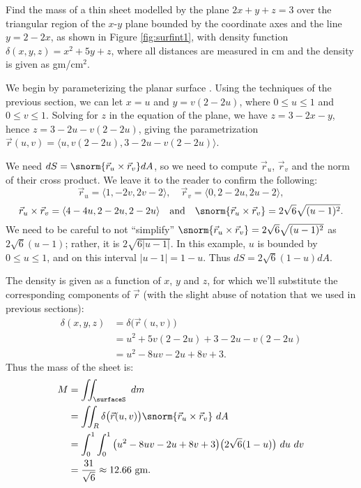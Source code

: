 {Find the mass of a thin sheet modelled by the plane $2x+y+z=3$ over the triangular region of the $x$-$y$ plane bounded by the coordinate axes and the line $y=2-2x$, as shown in Figure \ref{fig:surfint1}, with density function $\delta(x,y,z) = x^2+5y+z$, where all distances are measured in cm and the density is given as gm/cm$^2$. 
}
{We begin by parameterizing the planar surface \surfaceS. Using the techniques of the previous section, we can let $x=u$ and $y=v(2-2u)$, where $0\leq u\leq 1$ and $0\leq v\leq 1$. Solving for $z$ in the equation of the plane, we have $z=3-2x-y$, hence $z = 3-2u-v(2-2u)$, giving the parametrization
$\vec r(u,v) = \langle u, v(2-2u), 3-2u-v(2-2u)\rangle$.


We need $dS=\snorm{\vec r_u\times \vec r_v}dA$, so we need to compute $\vec r_u$, $\vec r_v$ and the norm of their cross product. We leave it to the reader to confirm the following:
\[
\vec r_u = \langle 1,-2v,2v-2\rangle,\quad \vec r_v = \langle 0,2-2u, 2u-2\rangle,
\]
\[
\vec r_u\times \vec r_v = \langle 4-4u,2-2u,2-2u\rangle\quad \text{and}\quad \snorm{\vec r_u\times \vec r_v} = 2\sqrt{6}\sqrt{(u-1)^2}.
\]
We need to be careful to not ``simplify'' $\snorm{\vec r_u\times \vec r_v} = 2\sqrt{6}\sqrt{(u-1)^2}$ as $2\sqrt{6}(u-1)$; rather, it is $2\sqrt{6\lvert u-1\rvert}$. In this example, $u$ is bounded by $0\leq u\leq 1$, and on this interval $\lvert u-1\rvert = 1-u$. Thus $dS = 2\sqrt{6}(1-u)dA$. 

The density is given as a function of $x$, $y$ and $z$, for which we'll substitute the corresponding components of $\vec r$ (with the slight abuse of notation that we used in previous sections): 
\begin{align*}
\delta(x,y,z) &= \delta\big(\vec r(u,v)\big) \\
			&= u^2 + 5v(2-2u)+3-2u-v(2-2u)\\
			&= u^2-8uv-2u+8v+3.
\end{align*}
Thus the mass of the sheet is:
\begin{align*}
M &= \iint_\surfaceS\ dm\\
	&= \iint_R \delta\big(\vec r(u,v)\big)\snorm{\vec r_u\times \vec r_v}\ dA\\
	&= \int_0^1\int_0^1 \big(u^2-8uv-2u+8v+3\big)\big(2\sqrt{6}(1-u)\big)\ du\ dv\\
	&= \frac{31}{\sqrt{6}} \approx 12.66 \text{ gm.}
\end{align*}
}\\

